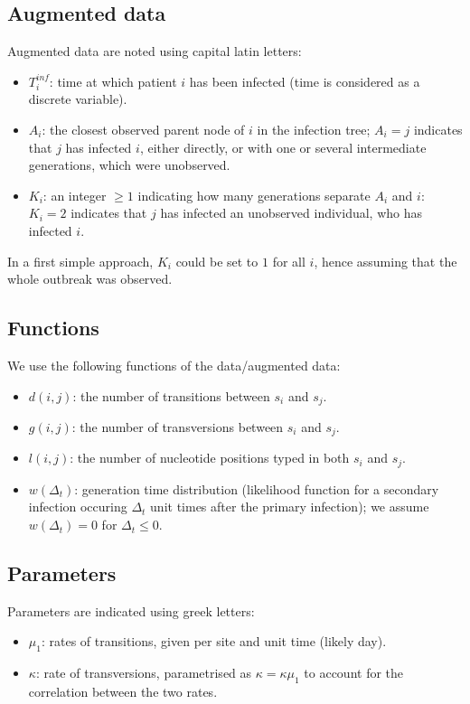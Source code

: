 \documentclass[10pt]{article}
\begin{document}
\subsection*{Augmented data}
Augmented data are noted using capital latin letters:
\begin{itemize}
	\item $T_i^{inf}$: time at which patient $i$ has been infected (time is considered as a discrete variable).
	\item $A_i$: the closest observed parent node of $i$ in the infection tree; $A_i=j$ indicates that $j$ has infected $i$, either directly, or with one or several intermediate generations, which were unobserved. 
	\item $K_i$: an integer $\geq 1$ indicating how many generations separate $A_i$ and $i$: $K_i=2$ indicates that $j$ has infected an unobserved individual, who has infected $i$.
\end{itemize}

In a first simple approach, $K_i$ could be set to $1$ for all $i$, hence assuming that the whole outbreak was observed.



\subsection*{Functions}
We use the following functions of the data/augmented data:
\begin{itemize}
	\item $d(i,j)$: the number of transitions between $s_i$ and $s_j$.
 	\item $g(i,j)$: the number of transversions between $s_i$ and $s_j$.
 	\item $l(i,j)$: the number of nucleotide positions typed in both $s_i$ and $s_j$.
 	\item $w(\Delta_t)$: generation time distribution (likelihood function for a secondary infection occuring $\Delta_t$ unit times after the primary infection); we assume $w(\Delta_t)=0$ for $\Delta_t \leq 0$.
\end{itemize}





\subsection*{Parameters}
Parameters are indicated using greek letters:
\begin{itemize}
	\item $\mu_1$: rates of transitions, given per site and unit time (likely day).
	\item $\kappa $: rate of transversions, parametrised as $\kappa = \kappa \mu_1$ to account for the correlation between the two rates.
\end{itemize}
\end{document}
